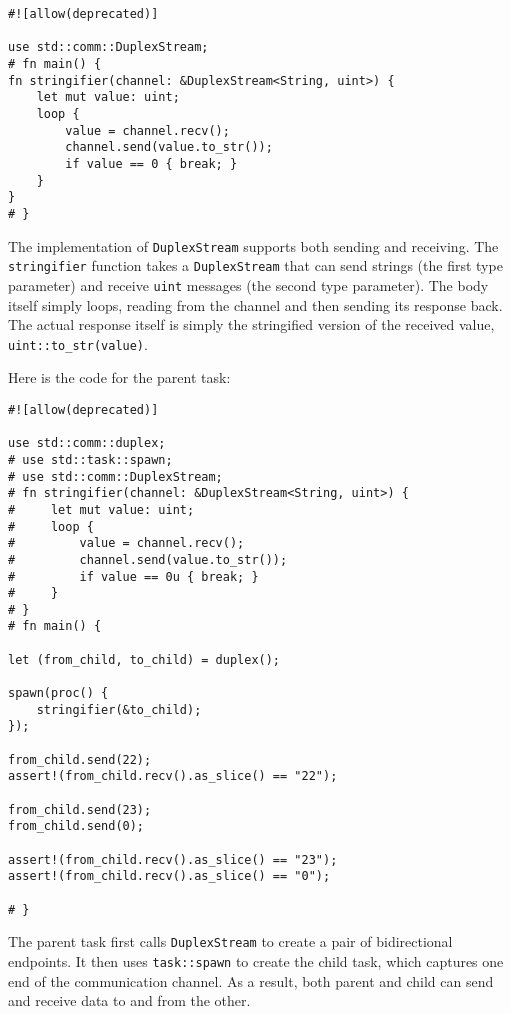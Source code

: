 \documentclass[]{article}
\begin{document}
\begin{verbatim}
#![allow(deprecated)]

use std::comm::DuplexStream;
# fn main() {
fn stringifier(channel: &DuplexStream<String, uint>) {
    let mut value: uint;
    loop {
        value = channel.recv();
        channel.send(value.to_str());
        if value == 0 { break; }
    }
}
# }
\end{verbatim}

The implementation of \texttt{DuplexStream} supports both sending and
receiving. The \texttt{stringifier} function takes a
\texttt{DuplexStream} that can send strings (the first type parameter)
and receive \texttt{uint} messages (the second type parameter). The body
itself simply loops, reading from the channel and then sending its
response back. The actual response itself is simply the stringified
version of the received value, \texttt{uint::to\_str(value)}.

Here is the code for the parent task:

\begin{verbatim}
#![allow(deprecated)]

use std::comm::duplex;
# use std::task::spawn;
# use std::comm::DuplexStream;
# fn stringifier(channel: &DuplexStream<String, uint>) {
#     let mut value: uint;
#     loop {
#         value = channel.recv();
#         channel.send(value.to_str());
#         if value == 0u { break; }
#     }
# }
# fn main() {

let (from_child, to_child) = duplex();

spawn(proc() {
    stringifier(&to_child);
});

from_child.send(22);
assert!(from_child.recv().as_slice() == "22");

from_child.send(23);
from_child.send(0);

assert!(from_child.recv().as_slice() == "23");
assert!(from_child.recv().as_slice() == "0");

# }
\end{verbatim}

The parent task first calls \texttt{DuplexStream} to create a pair of
bidirectional endpoints. It then uses \texttt{task::spawn} to create the
child task, which captures one end of the communication channel. As a
result, both parent and child can send and receive data to and from the
other.
\end{document}
